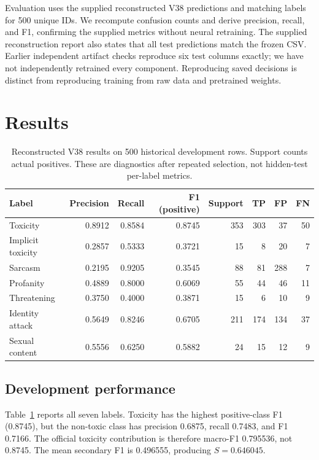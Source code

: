 \documentclass[10pt,a4paper]{article}
\begin{document}
Evaluation uses the supplied reconstructed V38 predictions and matching labels for 500 unique IDs. We recompute confusion counts and derive precision, recall, and F1, confirming the supplied metrics without neural retraining. The supplied reconstruction report also states that all test predictions match the frozen CSV. Earlier independent artifact checks reproduce six test columns exactly; we have not independently retrained every component. Reproducing saved decisions is distinct from reproducing training from raw data and pretrained weights.

\section{Results}
\begin{table}[t]\centering\small
\begin{tabular}{lrrrrrrr}\toprule
Label & Precision & Recall & F1 (positive) & Support & TP & FP & FN\\\midrule
Toxicity & 0.8912 & 0.8584 & 0.8745 & 353 & 303 & 37 & 50\\
Implicit toxicity & 0.2857 & 0.5333 & 0.3721 & 15 & 8 & 20 & 7\\
Sarcasm & 0.2195 & 0.9205 & 0.3545 & 88 & 81 & 288 & 7\\
Profanity & 0.4889 & 0.8000 & 0.6069 & 55 & 44 & 46 & 11\\
Threatening & 0.3750 & 0.4000 & 0.3871 & 15 & 6 & 10 & 9\\
Identity attack & 0.5649 & 0.8246 & 0.6705 & 211 & 174 & 134 & 37\\
Sexual content & 0.5556 & 0.6250 & 0.5882 & 24 & 15 & 12 & 9\\\bottomrule
\end{tabular}
\caption{Reconstructed V38 results on 500 historical development rows. Support counts actual positives. These are diagnostics after repeated selection, not hidden-test per-label metrics.}\label{tab:metrics}
\end{table}
\subsection{Development performance}
Table~\ref{tab:metrics} reports all seven labels. Toxicity has the highest positive-class F1 (0.8745), but the non-toxic class has precision 0.6875, recall 0.7483, and F1 0.7166. The official toxicity contribution is therefore macro-F1 0.795536, not 0.8745. The mean secondary F1 is 0.496555, producing $S=0.646045$.
\end{document}
